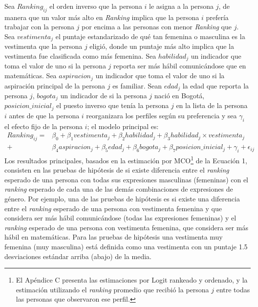 Sea $Ranking_{ij}$ el orden inverso que la persona $i$ le asigna a la persona $j$, de manera que un valor más alto en \textit{Ranking} implica que la persona $i$ prefería trabajar con la persona $j$ por encima a las personas con menor \textit{Ranking} que $j$. Sea $vestimenta_j$ el puntaje estandarizado de qué tan femenina o masculina es la vestimenta que la persona $j$ eligió, donde un puntaje más alto implica que la vestimenta fue clasificada como más femenina. Sea $habilidad_j$ un indicador que toma el valor de uno si la  persona $j$ reporta ser más hábil comunicándose que en matemáticas. Sea $aspiracion_j$ un indicador que toma el valor de uno si la aspiración principal de la persona $j$ es familiar. Sean $edad_j$ la edad que reporta la persona $j$, $bogota_j$ un indicador de si la persona $j$ nació en Bogotá, $posicion\_inicial_j$ el puesto inverso que tenía la persona $j$ en la lista de la persona $i$ antes de que la persona $i$ reorganizara los perfiles según su preferencia y sea $\gamma_i$ el efecto fijo de la persona $i$; el modelo principal es: 
\begin{equation}
    \begin{split}
	Ranking_{ij}=&\beta_0 + \beta_1vestimenta_j +  \beta_2habilidad_j + \beta_3habilidad_j\times vestimenta_{j} \\
	+ & \beta_4aspiracion_j + \beta_5edad_j + \beta_6bogota_j + \beta_7posicion\_inicial_j+\gamma_i + \epsilon_{ij}
	\end{split}
\end{equation}
Los resultados principales, basados en la estimación por MCO\footnote{El Apéndice C presenta las estimaciones por Logit rankeado y ordenado, y la estimación utilizando el \textit{ranking} promedio que recibió la persona $j$ entre todas las personas que observaron ese perfil.} de la Ecuación 1, consisten en las pruebas de hipótesis de si existe diferencia entre el \textit{ranking} esperado de una persona con todas sus expresiones masculinas (femeninas) con el \textit{ranking} esperado de cada una de las demás combinaciones de expresiones de género. Por ejemplo, una de las pruebas de hipótesis es si existe una diferencia entre el \textit{ranking} esperado de una persona con vestimenta femenina y que considera ser más hábil comunicándose (todas las expresiones femeninas) y el \textit{ranking} esperado de una persona con vestimenta femenina, que considera ser más hábil en matemáticas. Para las pruebas de hipótesis una vestimenta muy femenina (muy masculina) está definida como una vestimenta con un puntaje 1.5 desviaciones estándar arriba (abajo) de la media.

